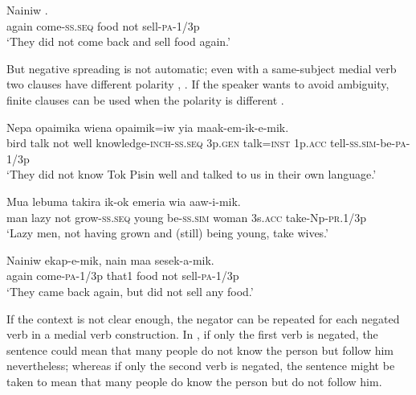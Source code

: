 \ea%
\label{ex:x1140}
\gll Nainiw        . \\
again  come-\textsc{ss}.\textsc{seq}  food  not  sell-\textsc{pa}-1/3p\\
\glt `They did not come back and sell food again.'
\z

But negative spreading is not automatic; even with a same-subject medial verb two clauses  have different polarity , . If the speaker wants to avoid ambiguity, finite clauses can be used when the polarity is different .

\ea%
\label{ex:x1156}
\gll Nepa  opaimika        wiena opaimik=iw  yia  maak-em-ik-e-mik.\\
bird  talk  not  well  knowledge-\textsc{inch}-\textsc{ss}.\textsc{seq}  3p.\textsc{gen} talk=\textsc{inst}  1p.\textsc{acc}  tell-\textsc{ss}.\textsc{sim}-be-\textsc{pa}-1/3p\\
\glt `They did not know Tok Pisin well and talked to us in their own language.'
\z

\ea%
\label{ex:x1763}
\gll Mua  lebuma      takira  ik-ok  emeria wia  aaw-i-mik.\\
man  lazy  not  grow-\textsc{ss}.\textsc{seq}  young  be-\textsc{ss}.\textsc{sim}  woman 3s.\textsc{acc}  take-Np-\textsc{pr}.1/3p\\
\glt `Lazy men, not having grown and (still) being young, take wives.'
\z

\ea%
\label{ex:x1153}
\gll Nainiw  ekap-e-mik,  nain  maa    sesek-a-mik. \\
again  come-\textsc{pa}-1/3p  that1  food  not  sell-\textsc{pa}-1/3p\\
\glt `They came back again, but did not sell any food.'
\z

If the context is not clear enough, the negator can be repeated for each negated verb in a medial verb construction. In , if only the first verb is negated, the sentence could mean that many people do not know the person but follow him nevertheless; whereas if only the second verb is negated, the sentence might be taken to mean that many people do know the person but do not follow him. 


